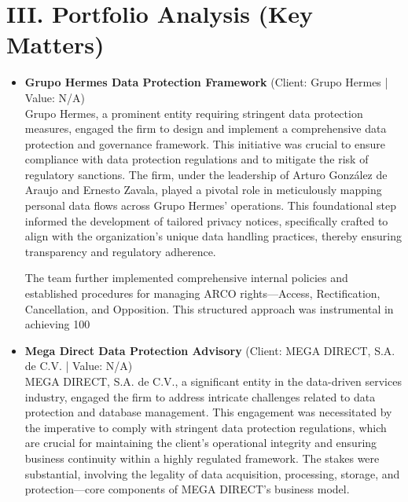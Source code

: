 \documentclass[11pt]{article}
\begin{document}
\section*{III. Portfolio Analysis (Key Matters)}
\begin{itemize}
\item \textbf{Grupo Hermes Data Protection Framework} (Client: Grupo Hermes | Value: N/A)\\ Grupo Hermes, a prominent entity requiring stringent data protection measures, engaged the firm to design and implement a comprehensive data protection and governance framework. This initiative was crucial to ensure compliance with data protection regulations and to mitigate the risk of regulatory sanctions. The firm, under the leadership of Arturo González de Araujo and Ernesto Zavala, played a pivotal role in meticulously mapping personal data flows across Grupo Hermes' operations. This foundational step informed the development of tailored privacy notices, specifically crafted to align with the organization's unique data handling practices, thereby ensuring transparency and regulatory adherence.

The team further implemented comprehensive internal policies and established procedures for managing ARCO rights—Access, Rectification, Cancellation, and Opposition. This structured approach was instrumental in achieving 100%
\item \textbf{Mega Direct Data Protection Advisory} (Client: MEGA DIRECT, S.A. de C.V. | Value: N/A)\\ MEGA DIRECT, S.A. de C.V., a significant entity in the data-driven services industry, engaged the firm to address intricate challenges related to data protection and database management. This engagement was necessitated by the imperative to comply with stringent data protection regulations, which are crucial for maintaining the client's operational integrity and ensuring business continuity within a highly regulated framework. The stakes were substantial, involving the legality of data acquisition, processing, storage, and protection—core components of MEGA DIRECT's business model.


\end{itemize}
\end{document}
